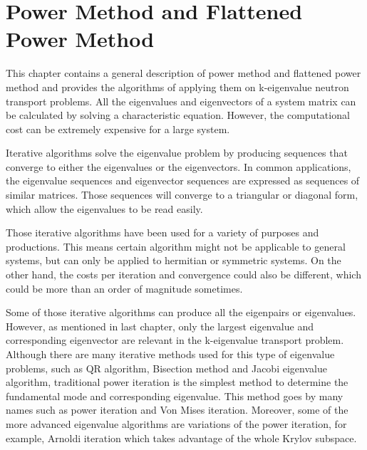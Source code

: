\cleardoublepage

\chapter{Power Method and Flattened Power Method}
\label{chapter:PM}

This chapter contains a general description of power method and flattened power method and provides the algorithms of applying them on k-eigenvalue neutron transport problems.
All the eigenvalues and eigenvectors of a system matrix can be calculated by solving a characteristic equation. 
However, the computational cost can be extremely expensive for a large system.

Iterative algorithms solve the eigenvalue problem by producing sequences that converge to either the eigenvalues or the eigenvectors.
In common applications, the eigenvalue sequences and eigenvector sequences are expressed as sequences of similar matrices. 
Those sequences will converge to a triangular or diagonal form, which allow the eigenvalues to be read easily. 

Those iterative algorithms have been used for a variety of purposes and productions.
This means certain algorithm might not be applicable to general systems, but can only be applied to hermitian or symmetric systems.
On the other hand, the costs per iteration and convergence could also be different, which could be more than an order of magnitude sometimes. 

Some of those iterative algorithms can produce all the eigenpairs or eigenvalues. 
However, as mentioned in last chapter, only the largest eigenvalue and corresponding eigenvector are relevant in the k-eigenvalue transport problem.
Although there are many iterative methods used for this type of eigenvalue problems, such as QR algorithm, Bisection method and Jacobi eigenvalue algorithm, traditional power iteration is the simplest method to determine the fundamental mode and corresponding eigenvalue.
This method goes by many names such as power iteration and Von Mises iteration.
Moreover, some of the more advanced eigenvalue algorithms are variations of the power iteration, for example, Arnoldi iteration which takes advantage of the whole Krylov subspace. 

